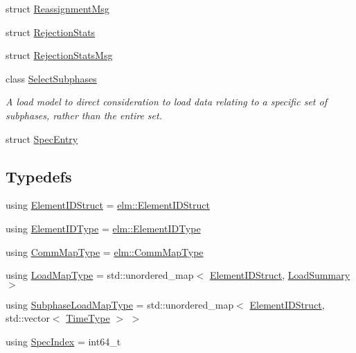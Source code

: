 \begin{DoxyCompactItemize}
\item 
struct \hyperlink{structvt_1_1vrt_1_1collection_1_1balance_1_1_reassignment_msg}{Reassignment\+Msg}
\item 
struct \hyperlink{structvt_1_1vrt_1_1collection_1_1balance_1_1_rejection_stats}{Rejection\+Stats}
\item 
struct \hyperlink{structvt_1_1vrt_1_1collection_1_1balance_1_1_rejection_stats_msg}{Rejection\+Stats\+Msg}
\item 
class \hyperlink{classvt_1_1vrt_1_1collection_1_1balance_1_1_select_subphases}{Select\+Subphases}
\begin{DoxyCompactList}\small\item\em A load model to direct consideration to load data relating to a specific set of subphases, rather than the entire set. \end{DoxyCompactList}\item 
struct \hyperlink{structvt_1_1vrt_1_1collection_1_1balance_1_1_spec_entry}{Spec\+Entry}
\end{DoxyCompactItemize}
\subsection*{Typedefs}
\begin{DoxyCompactItemize}
\item 
using \hyperlink{namespacevt_1_1vrt_1_1collection_1_1balance_a9f5b53fafb270212279a4757d2c4cd28}{Element\+I\+D\+Struct} = \hyperlink{structvt_1_1elm_1_1_element_i_d_struct}{elm\+::\+Element\+I\+D\+Struct}
\item 
using \hyperlink{namespacevt_1_1vrt_1_1collection_1_1balance_a592736f733df4f90856df90a1fd08905}{Element\+I\+D\+Type} = \hyperlink{namespacevt_1_1elm_a63afb64985b41b7b6dcf2f01336391f8}{elm\+::\+Element\+I\+D\+Type}
\item 
using \hyperlink{namespacevt_1_1vrt_1_1collection_1_1balance_a01ee1fb0ae2da1d2ab7fdca3be9ae351}{Comm\+Map\+Type} = \hyperlink{namespacevt_1_1elm_a38487cb8896b9b4763efa9022fab560e}{elm\+::\+Comm\+Map\+Type}
\item 
using \hyperlink{namespacevt_1_1vrt_1_1collection_1_1balance_a5339303db2e1ce964d783a53fd74e6b1}{Load\+Map\+Type} = std\+::unordered\+\_\+map$<$ \hyperlink{namespacevt_1_1vrt_1_1collection_1_1balance_a9f5b53fafb270212279a4757d2c4cd28}{Element\+I\+D\+Struct}, \hyperlink{structvt_1_1vrt_1_1collection_1_1balance_1_1_load_summary}{Load\+Summary} $>$
\item 
using \hyperlink{namespacevt_1_1vrt_1_1collection_1_1balance_a8bdadb2583f128dd256e7d5a10826542}{Subphase\+Load\+Map\+Type} = std\+::unordered\+\_\+map$<$ \hyperlink{namespacevt_1_1vrt_1_1collection_1_1balance_a9f5b53fafb270212279a4757d2c4cd28}{Element\+I\+D\+Struct}, std\+::vector$<$ \hyperlink{namespacevt_a876a9d0cd5a952859c72de8a46881442}{Time\+Type} $>$ $>$
\item 
using \hyperlink{namespacevt_1_1vrt_1_1collection_1_1balance_a72a5e0d9936ddf57f8e6c64e0e9fd123}{Spec\+Index} = int64\+\_\+t
\end{DoxyCompactItemize}
